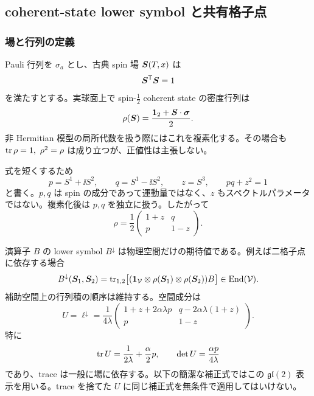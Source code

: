 \subsection{coherent-state lower symbol と共有格子点}
\subsubsection{場と行列の定義}

Pauli 行列を $\sigma_a$ とし、古典 spin 場 $\boldsymbol S(T,x)$ は
\begin{equation}
\boldsymbol S^{\mathsf T}\boldsymbol S=1
\label{audit5q:eq:spinconstraint}
\end{equation}
を満たすとする。実球面上で spin-$\tfrac12$ coherent state の密度行列は
\begin{equation}
\rho(\boldsymbol S)=\frac{\mathbf 1_2+\boldsymbol S\cdot\bm\sigma}{2}.
\end{equation}
非 Hermitian 模型の局所代数を扱う際にはこれを複素化する。その場合も $\operatorname{tr}\rho=1,\ \rho^2=\rho$ は成り立つが、正値性は主張しない。

式を短くするため
\begin{equation}
p=S^1+\ii S^2,\qquad q=S^1-\ii S^2,\qquad z=S^3,
\qquad pq+z^2=1
\label{audit5q:eq:pqz}
\end{equation}
と書く。$p,q$ は spin の成分であって運動量ではなく、$z$ もスペクトルパラメータではない。複素化後は $p,q$ を独立に扱う。したがって
\begin{equation}
\rho=\frac12\begin{pmatrix}1+z&q\\p&1-z\end{pmatrix}.
\end{equation}

演算子 $B$ の lower symbol $B^{\downarrow}$ は物理空間だけの期待値である。例えば二格子点に依存する場合
\begin{equation}
B^{\downarrow}(\boldsymbol S_1,\boldsymbol S_2)
=\operatorname{tr}_{1,2}\bigl[(\mathbf 1_{\mathcal V}\otimes\rho(\boldsymbol S_1)\otimes\rho(\boldsymbol S_2))B\bigr]
\in\operatorname{End}(\mathcal V).
\label{audit5q:eq:lower}
\end{equation}
補助空間上の行列積の順序は維持する。空間成分は
\begin{equation}
U=\ell^{\downarrow}
=\frac1{4\lambda}
\begin{pmatrix}
1+z+2\alpha\lambda p&q-2\alpha\lambda(1+z)\\
p&1-z
\end{pmatrix}.
\label{audit5q:eq:U}
\end{equation}
特に
\begin{equation}
\operatorname{tr} U=\frac1{2\lambda}+\frac\alpha2p,\qquad
\det U=\frac{\alpha p}{4\lambda}
\label{audit5q:eq:traceU}
\end{equation}
であり、trace は一般に場に依存する。以下の簡潔な補正式ではこの $\mathfrak{gl}(2)$ 表示を用いる。trace を捨てた $U$ に同じ補正式を無条件で適用してはいけない。

